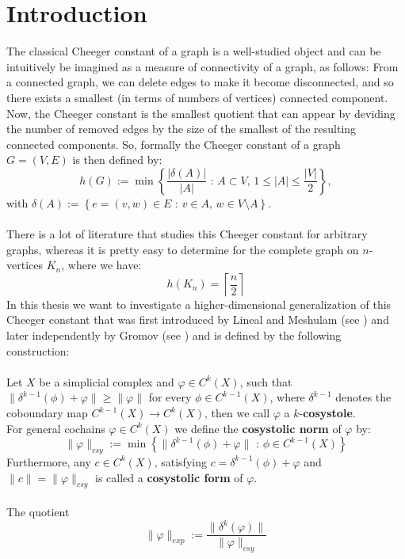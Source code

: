 
\chapter{Introduction}

\label{Introduction}
The classical Cheeger constant of a graph is a well-studied object and can be intuitively be imagined as a measure of connectivity of a graph, as follows: From a connected graph, we can delete edges to make it become disconnected, and so there exists a smallest (in terms of numbers of vertices) connected component. Now, the Cheeger constant is the smallest quotient that can appear by deviding the number of removed edges by the size of the smallest of the resulting connected components. So, formally the Cheeger constant of a graph \(G=(V,E)\) is then defined by:
\[
h(G):=\min\left\{\frac{|\delta(A)|}{|A|}\text{ : }A\subset V\text{, }1\leq |A|\leq\frac{|V|}{2}\right\},
\]
with \(\delta(A):=\left\{e=(v,w)\in E\text{ : }v\in A\text{, }w\in V\setminus A\right\}\).\\
\\
There is a lot of literature that studies this Cheeger constant for arbitrary graphs, whereas it is pretty easy to determine for the complete graph on \(n\)-vertices \(K_n\), where we have:
\[
h(K_n)=\left\lceil\frac{n}{2}\right\rceil
\]
In this thesis we want to investigate a higher-dimensional generalization of this Cheeger constant that was first introduced by Lineal and Meshulam (see \cite{2}) and later independently by Gromov (see \cite{3}) and is defined by the following construction:\\
\\
Let \(X\) be a simplicial complex and \(\varphi\in C^k(X)\), such that \(\|\delta^{k-1}(\phi)+\varphi\|\geq\|\varphi\|\) for every \(\phi\in C^{k-1}(X)\), where \(\delta^{k-1}\) denotes the coboundary map \(C^{k-1}(X)\rightarrow C^k(X)\), then we call \(\varphi\) a \(k\)-\textbf{cosystole}.\\
For general cochains \(\varphi\in C^k(X)\) we define the \textbf{cosystolic norm} of \(\varphi\) by:
\[
\|\varphi\|_{csy}:=\min\left\{\|\delta^{k-1}(\phi)+\varphi\|\text{ : }\phi\in C^{k-1}(X)\right\}
\]
Furthermore, any \(c\in C^k(X)\), satisfying \(c=\delta^{k-1}(\phi)+\varphi\) and \(\|c\|=\|\varphi\|_{csy}\) is called a \textbf{cosystolic form} of \(\varphi\).\\
\\
The quotient
\[
\|\varphi\|_{exp}:=\frac{\|\delta^k(\varphi)\|}{\|\varphi\|_{csy}}
\]
